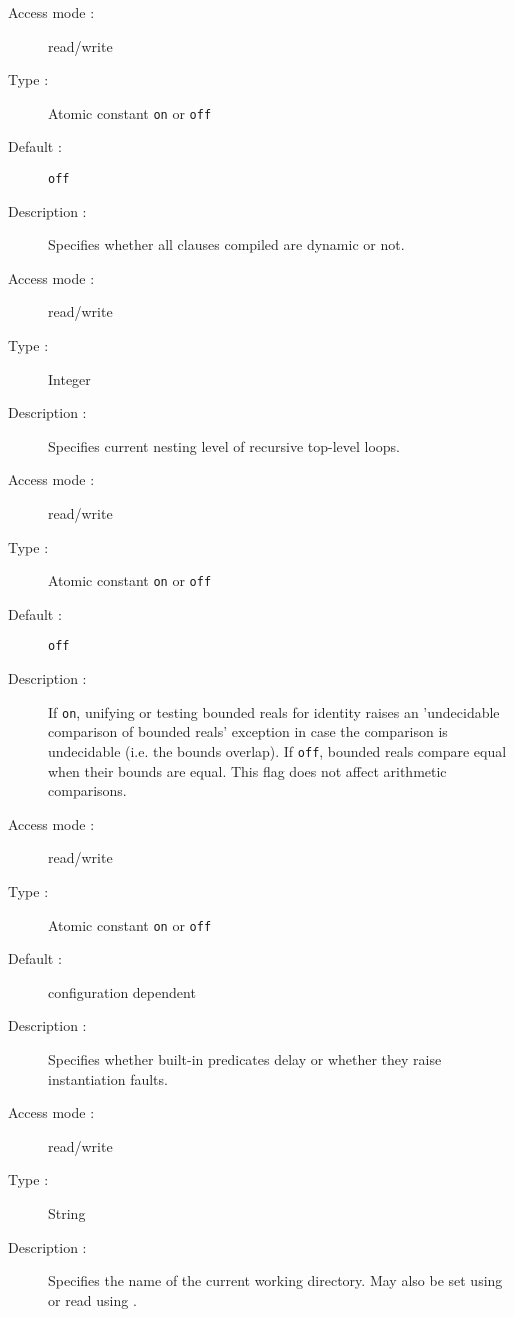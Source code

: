 \begin{description}
\begin{description}
\item[Access mode : ] read/write 
\item[Type : ] Atomic constant {\tt on} or {\tt off} 
\item[Default : ] {\tt off}
\item[Description : ] Specifies whether all clauses compiled are dynamic or not. 
\end{description}

\begin{description}
\item[Access mode : ] read/write
\item[Type : ] Integer
\item[Description : ] Specifies current nesting level of recursive
top-level loops.
\end{description}

\begin{description}
\item[Access mode : ] read/write
\item[Type : ] Atomic constant {\tt on} or {\tt off}
\item[Default : ] {\tt off}
\item[Description : ]
If {\tt on},  unifying or testing bounded reals for identity raises
an 'undecidable comparison of bounded reals' exception in case the
comparison is undecidable (i.e. the bounds overlap).
If {\tt off}, bounded reals compare equal when their bounds
are equal. This flag does not affect arithmetic comparisons.
\end{description}

\begin{description}
\item[Access mode : ] read/write
\item[Type : ] Atomic constant {\tt on} or {\tt off} 
\item[Default : ] configuration dependent
\item[Description : ] Specifies whether built-in predicates delay or whether
they raise instantiation faults.
\end{description}

\begin{description}
\item[Access mode : ] read/write
\item[Type : ] String 
\item[Description : ] Specifies the name of the current working directory.
May also be set using  or read using .
\end{description}


\end{description}
